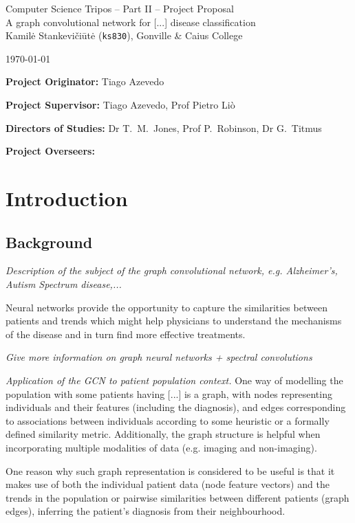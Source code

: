 \documentclass[12pt,a4paper,twoside]{article}
\begin{document}
\begin{center}
\Large
Computer Science Tripos -- Part II -- Project Proposal\\[4mm]
\LARGE
A graph convolutional network for [...] disease classification\\[4mm]

\large
Kamilė Stankevičiūtė (\texttt{ks830}), Gonville \& Caius College

\today %
\end{center}

\vspace{5mm}
\textbf{Project Originator:} Tiago Azevedo

\textbf{Project Supervisor:} Tiago Azevedo, Prof Pietro Liò

\textbf{Directors of Studies:} Dr T.~M.~Jones, Prof P.~Robinson, Dr G.~Titmus

\textbf{Project Overseers:} 


\section*{Introduction}

\subsection*{Background}

\textit{Description of the subject of the graph convolutional network, e.g. Alzheimer's, Autism Spectrum disease,...}

Neural networks provide the opportunity to capture the similarities between patients and trends which might help physicians to understand the mechanisms of the disease and in turn find more effective treatments.

\textit{Give more information on graph neural networks + spectral convolutions}

\textit{Application of the GCN to patient population context.} One way of modelling the population with some patients having [...] is a graph, with nodes representing individuals and their features (including the diagnosis), and edges corresponding to associations between individuals according to some heuristic or a formally defined similarity metric. Additionally, the graph structure is helpful when incorporating multiple modalities of data (e.g. imaging and non-imaging).

One reason why such graph representation is considered to be useful is that it makes use of both the individual patient data (node feature vectors) and the trends in the population or pairwise similarities between different patients (graph edges), inferring the patient's diagnosis from their neighbourhood. 
\end{document}
